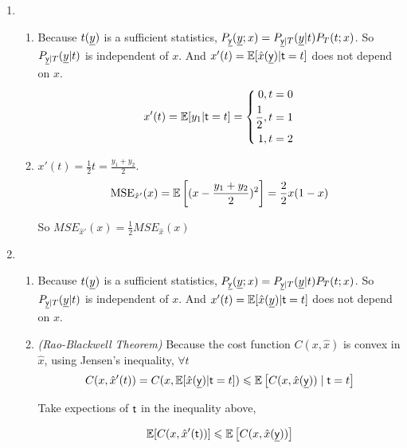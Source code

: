 \documentclass[a4paper]{article}
\begin{document}
\begin{enumerate}
\begin{enumerate}
    \item \begin{enumerate}
      \item Because $t(\underline{y})$ is a sufficient statistics, $P_{\underline{\mathsf{y}}}(\underline{y};x) = P_{\underline{\mathsf{y}}|T}(\underline{y}|t) P_{T}(t;x)$. So $P_{\underline{\mathsf{y}}|T}(\underline{y}|t)$ is independent of $x$. And $x'(t) = \operatorname{\mathbb{E}}[\hat{x}(\underline{\mathsf{y}}) | \mathsf{t} = t]$ does not depend on $x$.
      \begin{equation}
        x'(t) = \operatorname{\mathbb{E}}[y_1| \mathsf{t} = t] = \left\{\begin{aligned}
          0, t=0 \\ \frac{1}{2}, t= 1 \\ 1, t= 2
        \end{aligned}\right.
      \end{equation}
      \item $x'(t) = \frac{1}{2} t = \frac{y_1+y_2}{2}$. \begin{equation}
      \operatorname{MSE}_{\hat{x}'}(x) = \operatorname{\mathbb{E}} \left[(x-\frac{y_1+y_2}{2})^2\right] = \frac{2}{2}x(1-x)
    \end{equation}

    So $MSE_{\hat{x}'}(x) =  \frac{1}{2} MSE_{\hat{x}}(x)$
    \end{enumerate}

    \item \begin{enumerate}
      \item Because $t(\underline{y})$ is a sufficient statistics, $P_{\underline{\mathsf{y}}}(\underline{y};x) = P_{\underline{\mathsf{y}}|T}(\underline{y}|t) P_{T}(t;x)$. So $P_{\underline{\mathsf{y}}|T}(\underline{y}|t)$ is independent of $x$. And $x'(t) = \operatorname{\mathbb{E}}[\hat{x}(\underline{y}) | \mathsf{t} = t]$ does not depend on $x$.
      \item \textit{(Rao-Blackwell Theorem)} Because the cost function $C(x,\hat{x})$ is convex in $\hat{x}$, using Jensen's inequality, $\forall t$
      \begin{equation}
        C(x,\hat{x}'(t))  = C(x, \operatorname{\mathbb{E}}[\hat{x}(\underline{\mathsf{y}}) | \mathsf{t} = t]) \leqslant \operatorname{\mathbb{E}}\left[C(x,\hat{x}(\underline{\mathsf{y}})) \mid  \mathsf{t} = t \right] 
      \end{equation}

      Take expections of $\mathsf{t}$ in the inequality above,

      \begin{equation}
        \operatorname{\mathbb{E}}[C(x,\hat{x}'(\mathsf{t}))] \leqslant \operatorname{\mathbb{E}}\left[C(x,\hat{x}(\underline{\mathsf{y}})) \right] 
      \end{equation}
    \end{enumerate}
  \end{enumerate}


\end{enumerate}
\end{document}
